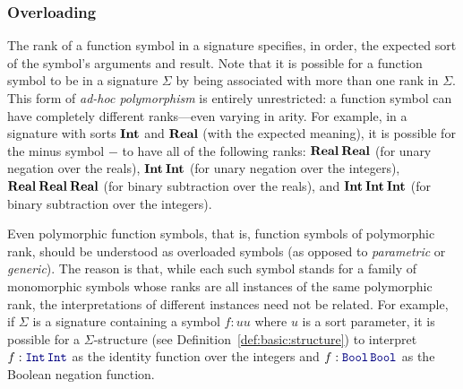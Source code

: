 \subsubsection{Overloading}
The rank of a function symbol in a signature specifies, in order,
the expected sort of the symbol's arguments and result.
Note that it is possible for a function symbol
to be  in a signature $\Sigma$
by being associated with more than one rank in $\Sigma$.
This form of \emph{ad-hoc polymorphism} is entirely unrestricted: 
a function symbol can have completely different ranks---even varying in arity. 
For example,
in a signature with sorts $\textbf{Int}$ and $\textbf{Real}$ (with the expected meaning),
it is possible for the minus symbol $-$ to have all of the following ranks:  
$\textbf{Real}\:\textbf{Real}$ (for unary negation over the reals),
$\textbf{Int}\:\textbf{Int}$ (for unary negation over the integers),
$\textbf{Real}\:\textbf{Real}\:\textbf{Real}$ (for binary subtraction over the reals),
and
$\textbf{Int}\:\textbf{Int}\:\textbf{Int}$ (for binary subtraction over the integers).

\begin{remark}
Even polymorphic function symbols, that is, 
function symbols of polymorphic rank, should be understood as overloaded symbols
(as opposed to \emph{parametric} or \emph{generic}).  
The reason is that, while each such symbol stands for a family of monomorphic symbols 
whose ranks are all instances of the same polymorphic rank,
the interpretations of different instances need not be related.
For example, if $\Sigma$ is a signature containing a symbol $f:uu$ 
where $u$ is a sort parameter,
it is possible for a $\Sigma$-structure (see Definition~\ref{def:basic:structure}) 
to interpret
$f:\ter{Int}\,\ter{Int}$ as the identity function over the integers and 
$f:\ter{Bool}\,\ter{Bool}$ as the Boolean negation function. 
\end{remark}


